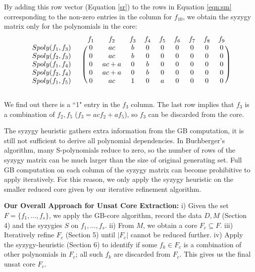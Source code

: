 \begin{Example}
 By adding this row vector (Equation \ref{sr}) to the rows in
 Equation \ref{eqn:sm} corresponding to the non-zero entries in the
 column for $f_{10}$, we obtain the syzygy matrix only for the
 polynomials in the core:
  \[
 \begin{blockarray}{ccccccccccc}
  && f_1 & f_2 & f_3 & f_4 & f_5 & f_6 & f_7 & f_8 & f_9  \\
  \begin{block}{cc(ccccccccc)}
  Spoly(f_1,f_3)\ & & 0 & ac & b &0&0&0&0&0&0\\
  Spoly(f_2,f_3)\  && 0 & ac & b &0&0&0&0&0&0\\
  Spoly(f_1,f_4)\  && 0 & ac+a & 0 &b&0&0&0&0&0\\
  Spoly(f_2,f_4)\  && 0 & ac+a & 0 &b&0&0&0&0&0\\
  Spoly(f_1,f_5)\  && 0 & ac & 1 &0&a&0&0&0&0\\
  \end{block}
  \end{blockarray}
 \]

 We find out there is a ``1" entry in the $f_3$ column. The last row
 implies that $f_3$ is a combination of $f_2, f_5$ ($f_3 = ac f_2 + a
 f_5$), so $f_3$ can be discarded from the core. 

 \end{Example}

The syzygy heuristic gathers extra information from the GB
computation, it is still not sufficient to derive all polynomial
dependencies. In Buchberger's algorithm,  many S-polynomials reduce to
zero, so the number of rows of the syzygy matrix can be much larger than
the size of original generating set. Full GB computation on each
column of the syzygy matrix can become prohibitive to apply
iteratively. For this reason, we only apply the syzygy heuristic
on the smaller reduced core given by our iterative refinement algorithm.

\textbf{Our Overall Approach for Unsat Core Extraction:} i) Given
the set $F = \{f_1,\dots,f_s\}$, we apply the GB-core algorithm,
record the data $D, M$ (Section 4) and the syzygies $S$ on
$f_1,\dots,f_s$. ii) From $M$, we obtain a core $F_c \subseteq
F$. iii) Iteratively refine $F_c$ (Section 5) until $|F_c|$ cannot be
reduced further. iv) Apply the syzygy-heuristic (Section 6) to
identify if some $f_k \in F_c$ is a combination of other polynomials
in $F_c$; all such $f_k$ are discarded from $F_c$. This gives us the
final unsat core $F_c$. 

